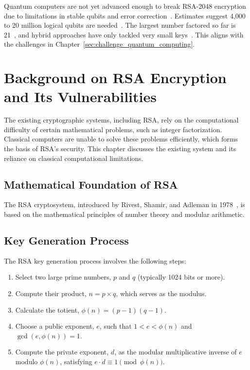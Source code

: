 \documentclass[12pt,a4paper]{report}
\begin{document}
Quantum computers are not yet advanced enough to break RSA-2048 encryption due to limitations in stable qubits and error correction~\cite{SpinQShor, CatoNetworks}. Estimates suggest 4,000 to 20 million logical qubits are needed~\cite{BTQHowFar}. The largest number factored so far is 21~\cite{SpinQShor}, and hybrid approaches have only tackled very small keys~\cite{FreemindtronicRSA}. This aligns with the challenges in Chapter~\ref{sec:challenge_quantum_computing}.


\chapter{Background on RSA Encryption and Its Vulnerabilities}
The existing cryptographic systems, including RSA, rely on the computational difficulty of certain mathematical problems, such as integer factorization. Classical computers are unable to solve these problems efficiently, which forms the basis of RSA's security. This chapter discusses the existing system and its reliance on classical computational limitations.

\section{Mathematical Foundation of RSA}
The RSA cryptosystem, introduced by Rivest, Shamir, and Adleman in 1978~\cite{Rivest1978}, is based on the mathematical principles of number theory and modular arithmetic.

\section{Key Generation Process}
\label{sec:key_generation}
The RSA key generation process involves the following steps:
\begin{enumerate}
    \item Select two large prime numbers, \(p\) and \(q\) (typically 1024 bits or more).
    \item Compute their product, \(n = p \times q\), which serves as the modulus.
    \item Calculate the totient, \(\phi(n) = (p-1)(q-1)\).
    \item Choose a public exponent, \(e\), such that \(1 < e < \phi(n)\) and \(\gcd(e, \phi(n)) = 1\).
    \item Compute the private exponent, \(d\), as the modular multiplicative inverse of \(e\) modulo \(\phi(n)\), satisfying \(e \cdot d \equiv 1 \pmod{\phi(n)}\).
\end{enumerate}
\end{document}
